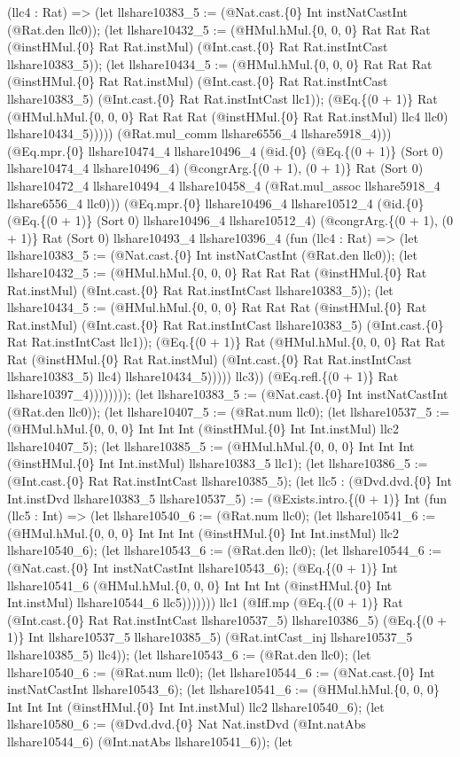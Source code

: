 \documentclass[11pt]{article}
\begin{document}
(llc4 : Rat) => (let llshare10383\_5 := (@Nat.cast.\{0\} Int instNatCastInt (@Rat.den llc0)); (let llshare10432\_5 := (@HMul.hMul.\{0, 0, 0\} Rat Rat Rat (@instHMul.\{0\} Rat Rat.instMul) (@Int.cast.\{0\} Rat Rat.instIntCast llshare10383\_5)); (let llshare10434\_5 := (@HMul.hMul.\{0, 0, 0\} Rat Rat Rat (@instHMul.\{0\} Rat Rat.instMul) (@Int.cast.\{0\} Rat Rat.instIntCast llshare10383\_5) (@Int.cast.\{0\} Rat Rat.instIntCast llc1)); (@Eq.\{(0 + 1)\} Rat (@HMul.hMul.\{0, 0, 0\} Rat Rat Rat (@instHMul.\{0\} Rat Rat.instMul) llc4 llc0) llshare10434\_5))))) (@Rat.mul\_comm llshare6556\_4 llshare5918\_4))) (@Eq.mpr.\{0\} llshare10474\_4 llshare10496\_4 (@id.\{0\} (@Eq.\{(0 + 1)\} (Sort 0) llshare10474\_4 llshare10496\_4) (@congrArg.\{(0 + 1), (0 + 1)\} Rat (Sort 0) llshare10472\_4 llshare10494\_4 llshare10458\_4 (@Rat.mul\_assoc llshare5918\_4 llshare6556\_4 llc0))) (@Eq.mpr.\{0\} llshare10496\_4 llshare10512\_4 (@id.\{0\} (@Eq.\{(0 + 1)\} (Sort 0) llshare10496\_4 llshare10512\_4) (@congrArg.\{(0 + 1), (0 + 1)\} Rat (Sort 0) llshare10493\_4 llshare10396\_4 (fun (llc4 : Rat) => (let llshare10383\_5 := (@Nat.cast.\{0\} Int instNatCastInt (@Rat.den llc0)); (let llshare10432\_5 := (@HMul.hMul.\{0, 0, 0\} Rat Rat Rat (@instHMul.\{0\} Rat Rat.instMul) (@Int.cast.\{0\} Rat Rat.instIntCast llshare10383\_5)); (let llshare10434\_5 := (@HMul.hMul.\{0, 0, 0\} Rat Rat Rat (@instHMul.\{0\} Rat Rat.instMul) (@Int.cast.\{0\} Rat Rat.instIntCast llshare10383\_5) (@Int.cast.\{0\} Rat Rat.instIntCast llc1)); (@Eq.\{(0 + 1)\} Rat (@HMul.hMul.\{0, 0, 0\} Rat Rat Rat (@instHMul.\{0\} Rat Rat.instMul) (@Int.cast.\{0\} Rat Rat.instIntCast llshare10383\_5) llc4) llshare10434\_5))))) llc3)) (@Eq.refl.\{(0 + 1)\} Rat llshare10397\_4)))))))); (let llshare10383\_5 := (@Nat.cast.\{0\} Int instNatCastInt (@Rat.den llc0)); (let llshare10407\_5 := (@Rat.num llc0); (let llshare10537\_5 := (@HMul.hMul.\{0, 0, 0\} Int Int Int (@instHMul.\{0\} Int Int.instMul) llc2 llshare10407\_5); (let llshare10385\_5 := (@HMul.hMul.\{0, 0, 0\} Int Int Int (@instHMul.\{0\} Int Int.instMul) llshare10383\_5 llc1); (let llshare10386\_5 := (@Int.cast.\{0\} Rat Rat.instIntCast llshare10385\_5); (let llc5 : (@Dvd.dvd.\{0\} Int Int.instDvd llshare10383\_5 llshare10537\_5) := (@Exists.intro.\{(0 + 1)\} Int (fun (llc5 : Int) => (let llshare10540\_6 := (@Rat.num llc0); (let llshare10541\_6 := (@HMul.hMul.\{0, 0, 0\} Int Int Int (@instHMul.\{0\} Int Int.instMul) llc2 llshare10540\_6); (let llshare10543\_6 := (@Rat.den llc0); (let llshare10544\_6 := (@Nat.cast.\{0\} Int instNatCastInt llshare10543\_6); (@Eq.\{(0 + 1)\} Int llshare10541\_6 (@HMul.hMul.\{0, 0, 0\} Int Int Int (@instHMul.\{0\} Int Int.instMul) llshare10544\_6 llc5))))))) llc1 (@Iff.mp (@Eq.\{(0 + 1)\} Rat (@Int.cast.\{0\} Rat Rat.instIntCast llshare10537\_5) llshare10386\_5) (@Eq.\{(0 + 1)\} Int llshare10537\_5 llshare10385\_5) (@Rat.intCast\_inj llshare10537\_5 llshare10385\_5) llc4)); (let llshare10543\_6 := (@Rat.den llc0); (let llshare10540\_6 := (@Rat.num llc0); (let llshare10544\_6 := (@Nat.cast.\{0\} Int instNatCastInt llshare10543\_6); (let llshare10541\_6 := (@HMul.hMul.\{0, 0, 0\} Int Int Int (@instHMul.\{0\} Int Int.instMul) llc2 llshare10540\_6); (let llshare10580\_6 := (@Dvd.dvd.\{0\} Nat Nat.instDvd (@Int.natAbs llshare10544\_6) (@Int.natAbs llshare10541\_6)); (let 
\end{document}
